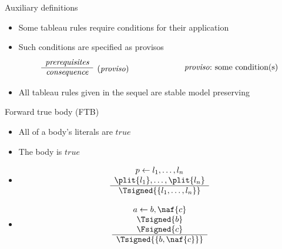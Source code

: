\begin{frame}{Auxiliary definitions}
  \begin{itemize}
  \item Some tableau rules require conditions for their application
  \item Such conditions are specified as \alert{provisos}
    \[
    \begin{array}{lcr}
      \begin{array}{cl}
        \textit{prerequisites} &
        \raisebox{-8pt}[0pt][0pt]{(\textit{proviso})}
        \\\cline{1-1}
        \textit{consequence}
      \end{array}
      & \hspace{1.5cm} &
      \textit{proviso\/}{:}\text{ some condition(s)}
    \end{array}
    \]
    \bigskip
  \item {} All tableau rules given in the sequel are stable model preserving
  \end{itemize}
\end{frame}
\begin{frame}{Forward true body (FTB)}
\begin{itemize}
\item {} All of a body's literals are $\mathit{true}$
\item {} The body is $\mathit{true}$
\item {}
\[
\begin{array}{c}
p \leftarrow l_1,\dots,l_n \\
\plit{l_1},\dots,\plit{l_n} \\\hline
\Tsigned{\{l_1,\dots,l_n\}}
\end{array}
\]
\item<2-> 
\[
\begin{array}{c}
a \leftarrow b, \naf{c} \\
\Tsigned{b} \\
\Fsigned{c} \\\hline
\Tsigned{\{b, \naf{c}\}}
\end{array}
\]
\end{itemize}
\end{frame}
